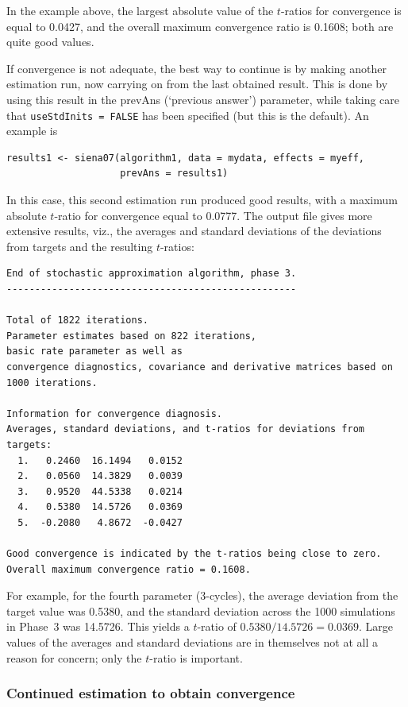 \documentclass[a4paper,fleqn,11pt]{article}
\newcommand{\+}{\, + \,}
\begin{document}
In the example above, the largest absolute value of the $t$-ratios for convergence
is equal to 0.0427, and the overall maximum convergence ratio is 0.1608;
both are quite good values.

If convergence is not adequate, the best way to continue
is by making another estimation run,
now carrying on from the last obtained result. This is done by
using this result in the \textsf{prevAns} (`previous answer')
parameter, while taking care that  \texttt{useStdInits = FALSE}
has been specified (but this is the default). An example is
\begin{verbatim}
results1 <- siena07(algorithm1, data = mydata, effects = myeff,
                    prevAns = results1)
\end{verbatim}
In this case, this second estimation run produced good results, with a
maximum absolute   $t$-ratio for convergence equal to 0.0777.
The output file gives more extensive results, viz.,
 the averages and standard deviations of the
deviations from targets and the resulting $t$-ratios:

{\footnotesize
\begin{verbatim}
End of stochastic approximation algorithm, phase 3.
---------------------------------------------------

Total of 1822 iterations.
Parameter estimates based on 822 iterations,
basic rate parameter as well as
convergence diagnostics, covariance and derivative matrices based on 1000 iterations.

Information for convergence diagnosis.
Averages, standard deviations, and t-ratios for deviations from targets:
  1.   0.2460  16.1494   0.0152
  2.   0.0560  14.3829   0.0039
  3.   0.9520  44.5338   0.0214
  4.   0.5380  14.5726   0.0369
  5.  -0.2080   4.8672  -0.0427

Good convergence is indicated by the t-ratios being close to zero.
Overall maximum convergence ratio = 0.1608.
\end{verbatim}
}
For example, for the fourth parameter (3-cycles), the average deviation
from the target value was 0.5380, and the standard deviation across the
1000 simulations in Phase~3 was  14.5726. This yields a $t$-ratio
of $ 0.5380 / 14.5726 = 0.0369$.
Large values of the averages and standard deviations are
in themselves not at all a reason for concern; only the
$t$-ratio is important.

\subsubsection{Continued estimation to obtain convergence}
\label{S_contconv}
\end{document}
